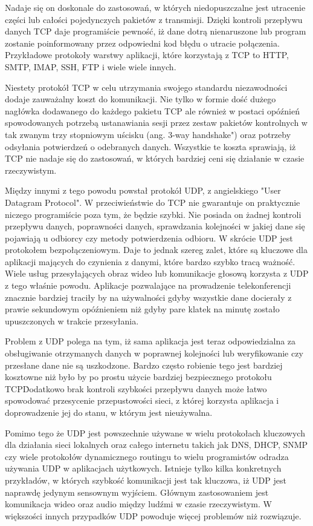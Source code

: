 \documentclass[10pt]{scrartcl}
\begin{document}
Nadaje się on doskonale do zastosowań, w których niedopuszczalne jest utracenie części lub całości pojedynczych pakietów z transmisji. Dzięki kontroli przepływu danych TCP daje programiście pewność, iż dane dotrą nienaruszone lub program zostanie poinformowany przez odpowiedni kod błędu o utracie połączenia. Przykładowe protokoły warstwy aplikacji, które korzystają z TCP to HTTP, SMTP, IMAP, SSH, FTP i wiele wiele innych.

Niestety protokół TCP w celu utrzymania swojego standardu niezawodności dodaje zauważalny koszt do komunikacji. Nie tylko w formie dość dużego nagłówka dodawanego do każdego pakietu TCP ale również w postaci opóźnień spowodowanych potrzebą ustanawiania sesji przez zestaw pakietów kontrolnych w tak zwanym trzy stopniowym uścisku (ang. 3-way handshake") oraz potrzeby odsyłania potwierdzeń o odebranych danych. Wszystkie te koszta sprawiają, iż TCP nie nadaje się do zastosowań, w których bardziej ceni się działanie w czasie rzeczywistym.

Między innymi z tego powodu powstał protokół UDP, z angielskiego "User Datagram Protocol". W przeciwieństwie do TCP nie gwarantuje on praktycznie niczego programiście poza tym, że będzie szybki. Nie posiada on żadnej kontroli przepływu danych, poprawności danych, sprawdzania kolejności w jakiej dane się pojawiają u odbiorcy czy metody potwierdzenia odbioru. W skrócie UDP jest protokołem bezpołączeniowym. Daje to jednak szereg zalet, które są kluczowe dla aplikacji mających do czynienia z danymi, które bardzo szybko tracą ważność. Wiele usług przesyłających obraz wideo lub komunikacje głosową korzysta z UDP z tego właśnie powodu. Aplikacje pozwalające na prowadzenie telekonferencji znacznie bardziej traciły by na używalności gdyby wszystkie dane docierały z prawie sekundowym opóźnieniem niż gdyby pare klatek na minutę zostało upuszczonych w trakcie przesyłania.

Problem z UDP polega na tym, iż sama aplikacja jest teraz odpowiedzialna za obsługiwanie otrzymanych danych w poprawnej kolejności lub weryfikowanie czy przesłane dane nie są uszkodzone. Bardzo często robienie tego jest bardziej kosztowne niż było by po prostu użycie bardziej bezpiecznego protokołu TCP\. Dodatkowo brak kontroli szybkości przepływu danych może łatwo spowodować przesycenie przepustowości sieci, z której korzysta aplikacja i doprowadzenie jej do stanu, w którym jest nieużywalna.

Pomimo tego że UDP jest powszechnie używane w wielu protokołach kluczowych dla działania sieci lokalnych oraz całego internetu takich jak DNS, DHCP, SNMP czy wiele protokołów dynamicznego routingu to wielu programistów odradza używania UDP w aplikacjach użytkowych. Istnieje tylko kilka konkretnych przykładów, w których szybkość komunikacji jest tak kluczowa, iż UDP jest naprawdę jedynym sensownym wyjściem. Głównym zastosowaniem jest komunikacja wideo oraz audio między ludźmi w czasie rzeczywistym. W większości innych przypadków UDP powoduje więcej problemów niż rozwiązuje.
\end{document}
